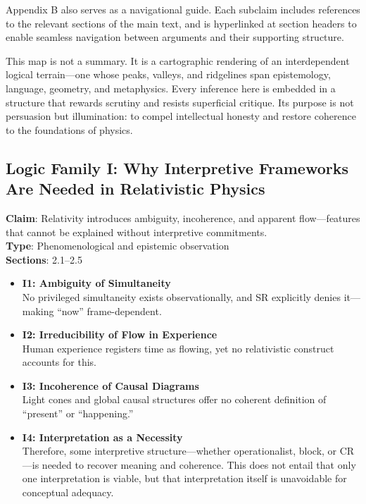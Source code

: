 \documentclass[12pt]{book}
\begin{document}
Appendix B also serves as a navigational guide. Each subclaim includes references to the relevant sections of the main text, and is hyperlinked at section headers to enable seamless navigation between arguments and their supporting structure.

This map is not a summary. It is a cartographic rendering of an interdependent logical terrain---one whose peaks, valleys, and ridgelines span epistemology, language, geometry, and metaphysics. Every inference here is embedded in a structure that rewards scrutiny and resists superficial critique. Its purpose is not persuasion but illumination: to compel intellectual honesty and restore coherence to the foundations of physics.

\subsection*{Logic Family I: Why Interpretive Frameworks Are Needed in Relativistic Physics}
\textbf{Claim}: Relativity introduces ambiguity, incoherence, and apparent flow---features that cannot be explained without interpretive commitments.\\
\textbf{Type}: Phenomenological and epistemic observation\\
\textbf{Sections}: 2.1–2.5
\begin{itemize}
  \item \textbf{I1: Ambiguity of Simultaneity} \\
  No privileged simultaneity exists observationally, and SR explicitly denies it---making ``now'' frame-dependent.
  \item \textbf{I2: Irreducibility of Flow in Experience} \\
  Human experience registers time as flowing, yet no relativistic construct accounts for this.
  \item \textbf{I3: Incoherence of Causal Diagrams} \\
  Light cones and global causal structures offer no coherent definition of ``present'' or ``happening.''
  \item \textbf{I4: Interpretation as a Necessity} \\
  Therefore, some interpretive structure---whether operationalist, block, or CR---is needed to recover meaning and coherence. This does not entail that only one interpretation is viable, but that interpretation itself is unavoidable for conceptual adequacy.
\end{itemize}
\end{document}
